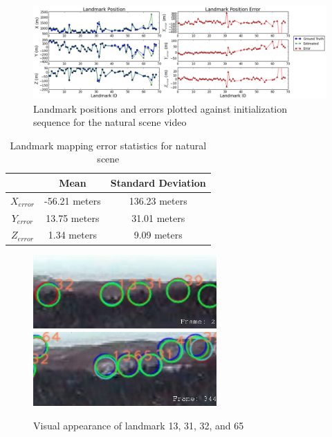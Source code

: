 \begin{figure}[h]
\centering
\includegraphics[width=16cm, keepaspectratio=true]
{./Figures/fltfig/cut1/Figure60.png}
\caption{Landmark positions and errors plotted against initialization
  sequence for the natural scene video}
\label{fltfig:9}
\end{figure}
\FloatBarrier
\begin{table}[h]
\caption{Landmark mapping error statistics for natural scene}
\label{tab:lm_err_stats_nat}
\centering
\begin{tabular}{|c|c|c|}
\hline
          & Mean       & Standard Deviation \\ \hline
$X_{error}$ & -56.21 meters    & 136.23 meters            \\ \hline
$Y_{error}$ & 13.75 meters     & 31.01 meters             \\ \hline
$Z_{error}$ & 1.34 meters      & 9.09 meters              \\ \hline
\end{tabular}
\end{table}      

\begin{figure}[h]
\centering
\includegraphics[width=7cm, keepaspectratio=true]
{./Figures/fltfig/landmark_13_31_32.jpg}
\includegraphics[width=7cm, keepaspectratio=true]
{./Figures/fltfig/landmark_13_65_32.jpg}
\caption{Visual appearance of landmark 13, 31, 32, and 65}
\label{fltfig:line_features}
\end{figure}

